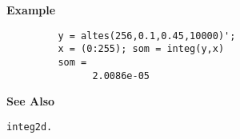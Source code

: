 {\bf \large \sf Example}
\begin{verbatim}
         y = altes(256,0.1,0.45,10000)'; 
         x = (0:255); som = integ(y,x)
         som = 
               2.0086e-05
\end{verbatim}
\vspace*{.5cm}


{\bf \large \sf See Also}\\
\hspace*{1.5cm}
\begin{minipage}[t]{13.5cm}
\begin{verbatim}
integ2d.
\end{verbatim}
\end{minipage}



